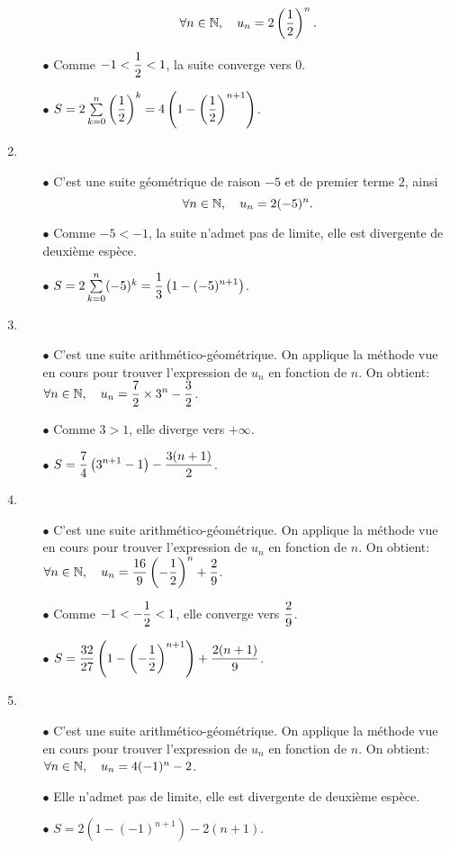\documentclass[a4paper, 11pt]{article}
\begin{document}
\begin{correction}
\begin{enumerate}
\begin{itemize}
$$\forall n\in\mathbb{N},\quad u_n=2\left(\displaystyle\frac{1}{2} \right)^n.$$
\item[$\bullet$]  Comme $-1<\displaystyle\frac{1}{2}<1$, la suite converge vers $0$.
\item[$\bullet$]  $S=2\sum\limits_{k=0}^n \left( \displaystyle\frac{1}{2}\right)^k=4\left( 1-\left(\displaystyle\frac{1}{2} \right)^{n+1} \right)$.
\end{itemize}
\item 
\begin{itemize}
 \item[$\bullet$] C'est une suite g\'eom\'etrique de raison $-5$ et de premier terme $2$, ainsi
$$\forall n\in\mathbb{N},\quad u_n=2(-5)^n.$$
\item[$\bullet$]  Comme $-5<-1$, la suite n'admet pas de limite, elle est divergente de deuxi\`eme esp\`ece.
\item[$\bullet$]  $S=2\sum\limits_{k=0}^n (-5)^k=\displaystyle\frac{1}{3}\left( 1-(-5)^{n+1} \right)$.
\end{itemize}
\item 
\begin{itemize}
 \item[$\bullet$] C'est une suite arithm\'etico-g\'eom\'etrique. On applique la m\'ethode vue en cours pour trouver l'expression 
de $u_n$ en fonction de $n$. On obtient: $\forall n\in\mathbb{N},\quad u_n=\displaystyle\frac{7}{2}\times 3^n-\displaystyle\frac{3}{2}$.
\item[$\bullet$]  Comme $3>1$, elle diverge vers $+\infty$.
\item[$\bullet$]  $S=\displaystyle\frac{7}{4}\left( 3^{n+1}-1 \right)-\displaystyle\frac{3(n+1)}{2}$.
\end{itemize}
\item 
\begin{itemize}
 \item[$\bullet$] C'est une suite arithm\'etico-g\'eom\'etrique. On applique la m\'ethode vue en cours pour trouver l'expression 
de $u_n$ en fonction de $n$. On obtient: $\forall n\in\mathbb{N},\quad u_n=\displaystyle\frac{16}{9}\left( -\displaystyle\frac{1}{2}\right)^n+\displaystyle\frac{2}{9}$.
\item[$\bullet$]  Comme $-1<-\displaystyle\frac{1}{2}<1$, elle converge vers $\displaystyle\frac{2}{9}$.
\item[$\bullet$]  $S=\displaystyle\frac{32}{27}\left(1- \left(-\displaystyle\frac{1}{2}\right)^{n+1} \right)+\displaystyle\frac{2(n+1)}{9}$.
\end{itemize}
\item 
\begin{itemize}
 \item[$\bullet$] C'est une suite arithm\'etico-g\'eom\'etrique. On applique la m\'ethode vue en cours pour trouver l'expression 
de $u_n$ en fonction de $n$. On obtient: $\forall n\in\mathbb{N},\quad u_n=4(-1)^n-2$.
\item[$\bullet$]  Elle n'admet pas de limite, elle est divergente de deuxi\`eme esp\`ece. 
\item[$\bullet$]  $S=2\left(1- \left(-1\right)^{n+1} \right)-2(n+1)$.
\end{itemize}
\end{enumerate}
\end{correction}
\end{document}
